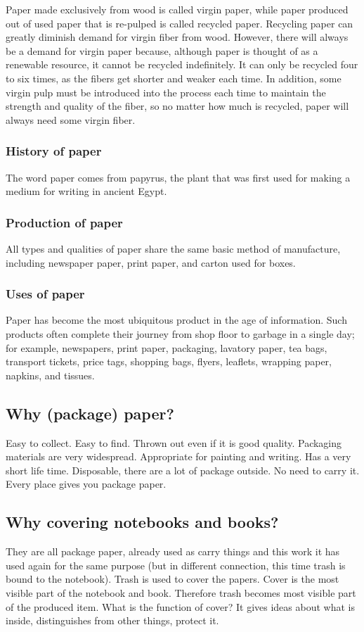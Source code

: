 Paper made exclusively from wood is called virgin paper, while paper produced out of used paper that is re-pulped is called recycled paper. Recycling paper can greatly diminish demand for virgin fiber from wood. However, there will always be a demand for virgin paper because, although paper is thought of as a renewable resource, it cannot be recycled indefinitely. It can only be recycled four to six times, as the fibers get shorter and weaker each time. In addition, some virgin pulp must be introduced into the process each time to maintain the strength and quality of the fiber, so no matter how much is recycled, paper will always need some virgin fiber.

%
\subsubsection{History of paper}
The word paper comes from papyrus, the plant that was first used for making a medium for writing in ancient Egypt.

%
\subsubsection{Production of paper}
All types and qualities of paper share the same basic method of manufacture, including newspaper paper, print paper, and carton used for boxes.

%
\subsubsection{Uses of paper}
Paper has become the most ubiquitous product in the age of information. Such products often complete their journey from shop floor to garbage in a single day; for example, newspapers, print paper, packaging, lavatory paper, tea bags, transport tickets, price tags, shopping bags, flyers, leaflets, wrapping paper, napkins, and tissues. 

\subsection{Why (package) paper?}
Easy to collect. Easy to find. Thrown out even if it is good quality. Packaging materials are very widespread. Appropriate for painting and writing. Has a very short life time. Disposable, there are a lot of package outside. No need to carry it. Every place gives you package paper. 

\subsection{Why covering notebooks and books?}
They are all package paper, already used as carry things and this work it has used again for the same purpose (but in different connection, this time trash is bound to the notebook). Trash is used to cover the papers. Cover is the most visible part of the notebook and book. Therefore trash becomes most visible part of the produced item. What is the function of cover? It gives ideas about what is inside, distinguishes from other things, protect it.

